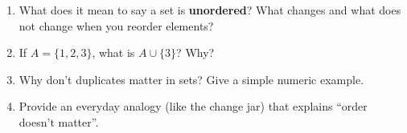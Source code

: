 \begin{enumerate}
  \item What does it mean to say a set is \textbf{unordered}? What changes and what does not change when you reorder elements?
  \item If $A = \{1,2,3\}$, what is $A \cup \{3\}$? Why?
  \item Why don’t duplicates matter in sets? Give a simple numeric example.
  \item Provide an everyday analogy (like the change jar) that explains “order doesn’t matter”.
\end{enumerate}

